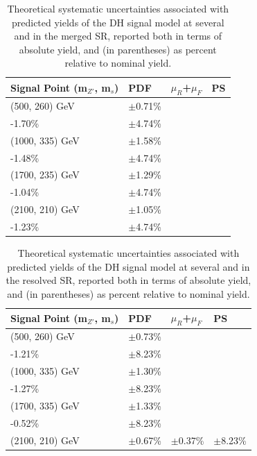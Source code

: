 \begin{table}[ht]
\begin{center}\small{
\caption[Theoretical systematic uncertainties associated with predicted yields of the DH signal model at several \ms and \mZp in the merged signal region.]{\label{tab:systs_sig_SR_mgd} Theoretical systematic uncertainties associated with predicted yields of the DH signal model at several \ms and \mZp in the merged SR, reported both in terms of absolute yield, and (in parentheses) as percent relative to nominal yield.}
\begin{tabular}{l l l l }
\toprule
\textbf{Signal Point (m\({_{Z'}}\), m\(_s\))} &\textbf{PDF} &\textbf{\(\mu_R\)+\(\mu_F\)} &\textbf{PS}\tabularnewline
\midrule
\midrule
(500, 260) GeV & \(\pm\)0.71\% & \(\substack{+1.76\%\\-1.70\%}\) & \(\pm\)4.74\% \tabularnewline
\midrule
(1000, 335) GeV & \(\pm\)1.58\% & \(\substack{+1.64\%\\-1.48\%}\) & \(\pm\)4.74\% \tabularnewline
\midrule
(1700, 235) GeV & \(\pm\)1.29\% & \(\substack{+0.98\%\\-1.04\%}\) & \(\pm\)4.74\% \tabularnewline
\midrule
(2100, 210) GeV & \(\pm\)1.05\% & \(\substack{+1.13\%\\-1.23\%}\) & \(\pm\)4.74\% \tabularnewline
\bottomrule
\end{tabular}
}
\end{center}
\end{table}

\begin{table}[ht]
\begin{center}\small{
\caption[Theoretical systematic uncertainties associated with predicted yields of the DH signal model at several \ms and \mZp in the resolved signal region.]{\label{tab:systs_sig_SR_res} Theoretical systematic uncertainties associated with predicted yields of the DH signal model at several \ms and \mZp in the resolved SR, reported both in terms of absolute yield, and (in parentheses) as percent relative to nominal yield.}
\begin{tabular}{l l l l }
\toprule
\textbf{Signal Point (m\({_{Z'}}\), m\(_s\))} &\textbf{PDF} &\textbf{\(\mu_R\)+\(\mu_F\)} &\textbf{PS}\tabularnewline
\midrule
\midrule
(500, 260) GeV & \(\pm\)0.73\% & \(\substack{+1.35\%\\-1.21\%}\) & \(\pm\)8.23\% \tabularnewline
\midrule
(1000, 335) GeV & \(\pm\)1.30\% & \(\substack{+1.40\%\\-1.27\%}\) & \(\pm\)8.23\% \tabularnewline
\midrule
(1700, 335) GeV & \(\pm\)1.33\% & \(\substack{+0.49\%\\-0.52\%}\) & \(\pm\)8.23\% \tabularnewline
\midrule
(2100, 210) GeV & \(\pm\)0.67\% & \(\pm\)0.37\% & \(\pm\)8.23\% \tabularnewline
\bottomrule
\end{tabular}
}
\end{center}
\end{table}

